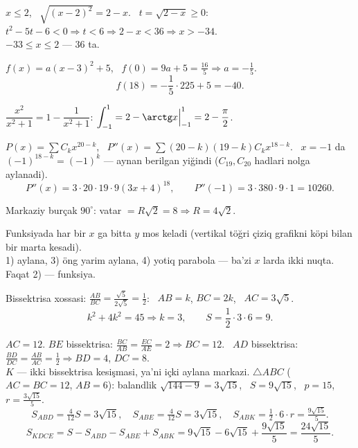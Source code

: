 $x\le2$, \ $\sqrt{(x-2)^2}=2-x$. \ $t=\sqrt{2-x}\ge0$: $t^2-5t-6<0\Rightarrow t<6\Rightarrow2-x<36\Rightarrow x>-34$.\\
$-33\le x\le2$ — 36 ta.

$f(x)=a(x-3)^2+5$, \ $f(0)=9a+5=\frac{16}5\Rightarrow a=-\frac15$.
\[f(18)=-\frac15\cdot225+5=-40.\]

$\dfrac{x^2}{x^2+1}=1-\dfrac1{x^2+1}$: \quad $\displaystyle\int_{-1}^1=2-\arctg x\Big|_{-1}^1=2-\frac\pi2$.

$P(x)=\sum C_kx^{20-k}$, \ $P''(x)=\sum(20-k)(19-k)C_kx^{18-k}$. \ $x=-1$ da $(-1)^{18-k}=(-1)^k$ — aynan berilgan yiğindi ($C_{19},C_{20}$ hadlari nolga aylanadi).
\[P''(x)=3\cdot20\cdot19\cdot9(3x+4)^{18},\qquad P''(-1)=3\cdot380\cdot9\cdot1=10260.\]

Markaziy burçak $90^\circ$: vatar $=R\sqrt2=8\Rightarrow R=4\sqrt2$.

Funksiyada har bir $x$ ga bitta $y$ mos keladi (vertikal töğri çiziq grafikni köpi bilan bir marta kesadi).\\
1) aylana, 3) öng yarim aylana, 4) yotiq parabola — ba'zi $x$ larda ikki nuqta. Faqat 2) — funksiya.

Bissektrisa xossasi: $\frac{AB}{BC}=\frac{\sqrt5}{2\sqrt5}=\frac12$: \ $AB=k$, $BC=2k$, \ $AC=3\sqrt5$.
\[k^2+4k^2=45\Rightarrow k=3,\qquad S=\frac12\cdot3\cdot6=9.\]

$AC=12$. $BE$ bissektrisa: $\frac{BC}{AB}=\frac{EC}{AE}=2\Rightarrow BC=12$. \ $AD$ bissektrisa: $\frac{BD}{DC}=\frac{AB}{AC}=\frac12\Rightarrow BD=4$, $DC=8$.\\
$K$ — ikki bissektrisa kesişmasi, ya'ni içki aylana markazi.
$\triangle ABC$ ($AC=BC=12$, $AB=6$): balandlik $\sqrt{144-9}=3\sqrt{15}$, \ $S=9\sqrt{15}$, \ $p=15$, \ $r=\frac{3\sqrt{15}}5$.
\[S_{ABD}=\tfrac4{12}S=3\sqrt{15},\quad S_{ABE}=\tfrac4{12}S=3\sqrt{15},\quad S_{ABK}=\tfrac12\cdot6\cdot r=\tfrac{9\sqrt{15}}5.\]
\[S_{KDCE}=S-S_{ABD}-S_{ABE}+S_{ABK}=9\sqrt{15}-6\sqrt{15}+\frac{9\sqrt{15}}5=\frac{24\sqrt{15}}5.\]

